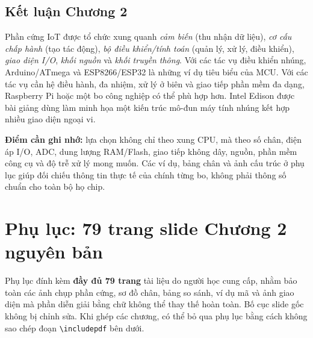 \section{Kết luận Chương 2}
Phần cứng IoT được tổ chức xung quanh \emph{cảm biến} (thu nhận dữ liệu), \emph{cơ cấu chấp hành} (tạo tác động), \emph{bộ điều khiển/tính toán} (quản lý, xử lý, điều khiển), \emph{giao diện I/O}, \emph{khối nguồn} và \emph{khối truyền thông}. Với các tác vụ điều khiển nhúng, Arduino/ATmega và ESP8266/ESP32 là những ví dụ tiêu biểu của MCU. Với các tác vụ cần hệ điều hành, đa nhiệm, xử lý ở biên và giao tiếp phần mềm đa dạng, Raspberry Pi hoặc một bo công nghiệp có thể phù hợp hơn. Intel Edison được bài giảng dùng làm minh họa một kiến trúc mô-đun máy tính nhúng kết hợp nhiều giao diện ngoại vi.

\textbf{Điểm cần ghi nhớ:} lựa chọn không chỉ theo xung CPU, mà theo số chân, điện áp I/O, ADC, dung lượng RAM/Flash, giao tiếp không dây, nguồn, phần mềm công cụ và độ trễ xử lý mong muốn. Các ví dụ, bảng chân và ảnh cấu trúc ở phụ lục giúp đối chiếu thông tin thực tế của chính từng bo, không phải thông số chuẩn cho toàn bộ họ chip.
\clearpage
\appendix
\chapter{Phụ lục: 79 trang slide Chương 2 nguyên bản}
Phụ lục đính kèm \textbf{đầy đủ 79 trang} tài liệu do người học cung cấp, nhằm bảo toàn các ảnh chụp phần cứng, sơ đồ chân, bảng so sánh, ví dụ mã và ảnh giao diện mà phần diễn giải bằng chữ không thể thay thế hoàn toàn. Bố cục slide gốc không bị chỉnh sửa. Khi ghép các chương, có thể bỏ qua phụ lục bằng cách không sao chép đoạn \texttt{\textbackslash includepdf} bên dưới.
